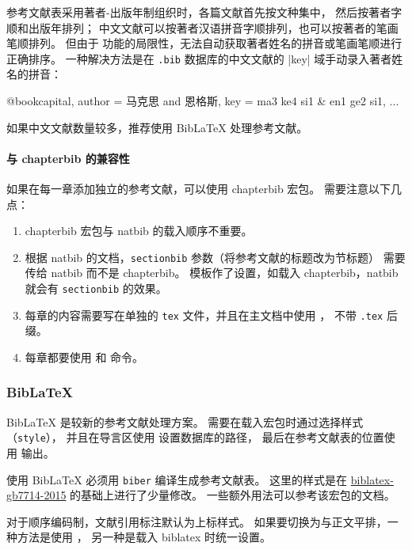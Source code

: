 \documentclass[a4paper]{ltxdoc}
\DeclareRobustCommand\file{\nolinkurl}
\DeclareRobustCommand\pkg{\textsf}
\DeclareRobustCommand\opt{\texttt}
\begin{document}
参考文献表采用著者-出版年制组织时，各篇文献首先按文种集中， 然后按著者字顺和出版年排列；
中文文献可以按著者汉语拼音字顺排列，也可以按著者的笔画笔顺排列。
但由于 \BibTeX{} 功能的局限性，无法自动获取著者姓名的拼音或笔画笔顺进行正确排序。
一种解决方法是在 \file{.bib} 数据库的中文文献的 |key| 域手动录入著者姓名的拼音：
\begin{latex}
  @book{capital,
    author = {马克思 and 恩格斯},
    key    = {ma3 ke4 si1 & en1 ge2 si1},
    ...
  }
\end{latex}
如果中文文献数量较多，推荐使用 BibLaTeX 处理参考文献。

\paragraph{与 \pkg{chapterbib} 的兼容性}
如果在每一章添加独立的参考文献，可以使用 \pkg{chapterbib} 宏包。
需要注意以下几点：
\begin{enumerate}
  \item \pkg{chapterbib} 宏包与 \pkg{natbib} 的载入顺序不重要。
  \item 根据 \pkg{natbib} 的文档，\opt{sectionbib} 参数（将参考文献的标题改为节标题）
    需要传给 \pkg{natbib} 而不是 \pkg{chapterbib}。
    模板作了设置，如载入 \pkg{chapterbib}，\pkg{natbib} 就会有 \opt{sectionbib} 的效果。
  \item 每章的内容需要写在单独的 \file{tex} 文件，并且在主文档中使用 ，
    不带 \file{.tex} 后缀。
  \item 每章都要使用  和  命令。
\end{enumerate}


\subsubsection{BibLaTeX}

BibLaTeX 是较新的参考文献处理方案。
需要在载入宏包时通过选择样式（\opt{style}），
并且在导言区使用  设置数据库的路径，
最后在参考文献表的位置使用  输出。
\begin{latex}
  \usepackage[style=ustcthesis-authoryear]{biblatex}
  
\end{latex}
使用 BibLaTeX 必须用 \file{biber} 编译生成参考文献表。
这里的样式是在 \href{https://ctan.org/pkg/biblatex-gb7714-2015}{biblatex-gb7714-2015}
的基础上进行了少量修改。
一些额外用法可以参考该宏包的文档。

对于顺序编码制，文献引用标注默认为上标样式。
如果要切换为与正文平排，一种方法是使用 ，
另一种是载入 \pkg{biblatex} 时统一设置。
\begin{latex}
  \usepackage[bibstyle=ustcthesis-numeric,
              citestyle=ustcthesis-inline]{biblatex}
\end{latex}
\end{document}
